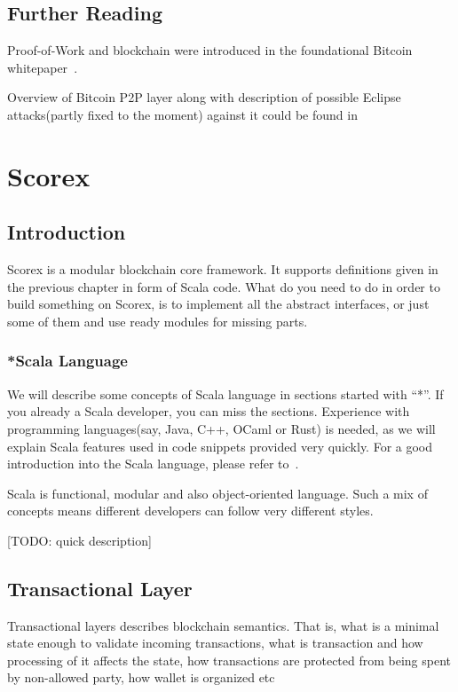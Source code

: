 \documentclass[]{report}   %
\begin{document}
\section{Further Reading}

Proof-of-Work and blockchain were introduced in the foundational Bitcoin whitepaper~\cite{Nakamoto2008}.

Overview of Bitcoin P2P layer along with description of possible Eclipse attacks(partly fixed to the moment) against it could be found in~\cite{heilman2015eclipse}


\chapter{Scorex}           %
\section{Introduction}     %

Scorex is a modular blockchain core framework. It supports definitions given in the previous chapter in form of Scala code. What do you need to do in order to build something on Scorex, is to implement all the abstract interfaces, or just some of them and use ready modules for missing parts.

\subsection{*Scala Language}         %

We will describe some concepts of Scala language in sections started with ``*''. If you already a Scala developer, you can miss the sections. Experience with programming languages(say, Java, C++, OCaml or Rust) is needed, as we will explain Scala features used in code snippets provided very quickly. For a good introduction into the Scala language, please refer to~\cite{odersky2008programming}.

Scala is functional, modular and also object-oriented language. Such a mix of concepts means different developers can follow very different styles. 

[TODO: quick description]

\section{Transactional Layer}

Transactional layers describes blockchain semantics. That is, what is a minimal state enough to validate incoming transactions, what is transaction and how processing of it affects the state, how transactions are protected from being spent by non-allowed party, how wallet is organized etc
\end{document}
